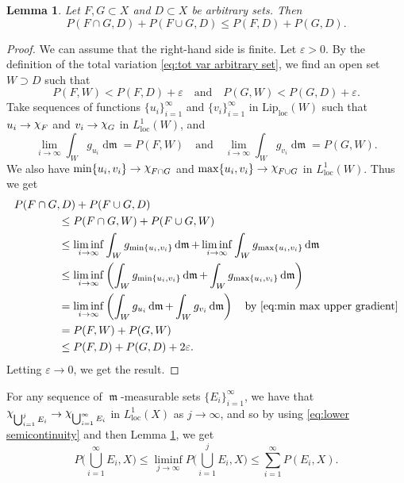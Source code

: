 \documentclass[11pt]{article}
\numberwithin{equation}{section}
\theoremstyle{plain}
\newtheorem{lemma}[equation]{Lemma}
\theoremstyle{definition}
\numberwithin{equation}{section}
\newcommand{\eps}{\varepsilon}
\newcommand{\loc}{\mathrm{loc}}
\newcommand{\liploc}{\mathrm{Lip}_{\mathrm{loc}}}
\newcommand{\ch}{\text{\raise 1.3pt \hbox{$\chi$}\kern-0.2pt}}
\DeclareMathOperator{\frm}{\mathfrak{m}}
\DeclareMathOperator{\dfrm}{d\mathfrak{m}}
\begin{document}
\begin{lemma}\label{lem:BV functions form algebra}
	Let $F,G\subset X$ and $D\subset X$ be arbitrary sets. Then
	\[
	P(F\cap G,D)+P(F\cup G,D)\le P(F,D)+P(G,D).
	\]
\end{lemma}
\begin{proof}
	We can assume that the right-hand side is finite. Let $\eps>0$.
	By the definition of the total variation \eqref{eq:tot var arbitrary set},
	we find an open set $W\supset D$ such that
	\begin{equation}\label{eq:choice of W and D}
	P(F,W)<P(F,D)+\eps\quad\textrm{and}\quad P(G,W)<P(G,D)+\eps.
	\end{equation}
	Take sequences
	of functions $\{u_i\}_{i=1}^{\infty}$ and $\{v_i\}_{i=1}^{\infty}$ in $\liploc(W)$
	such that $u_i\to \ch_F$ and $v_i\to \ch_G$ in $L^1_{\loc}(W)$, and
	\[
	\lim_{i\to\infty}\int_{W}g_{u_i}\dfrm= P(F,W)\quad\textrm{and}\quad
	\lim_{i\to\infty}\int_{W}g_{v_i}\dfrm= P(G,W).
	\]
	We also have $\min\{u_i,v_i\}\to \ch_{F\cap G}$ and
	$\max\{u_i,v_i\}\to \ch_{F\cup G}$ in $L^1_{\loc}(W)$. Thus we get
	\begin{align*}
	&P(F\cap G,D)+P(F\cup G,D)\\
	&\qquad\qquad\le P(F\cap G,W)+P(F\cup G,W)\\
	&\qquad\qquad\le \liminf_{i\to\infty}\int_{W} g_{\min\{u_i,v_i\}}\dfrm+
	\liminf_{i\to\infty}\int_{W} g_{\max\{u_i,v_i\}}\dfrm\\
	&\qquad\qquad\le \liminf_{i\to\infty}\left(\int_{W} g_{\min\{u_i,v_i\}}\dfrm+
	\int_{W} g_{\max\{u_i,v_i\}}\dfrm\right)\\
	&\qquad\qquad = \liminf_{i\to\infty}\left(\int_{W} g_{u_i}\dfrm+
	\int_{W} g_{v_i}\dfrm\right)\quad\textrm{by }\eqref{eq:min max upper gradient}\\
	&\qquad\qquad= P(F,W)+P(G,W)\\
	&\qquad\qquad\le  P(F,D)+P(G,D)+2\eps.
	\end{align*}
	Letting $\eps\to 0$, we get the result.
\end{proof}

For any sequence of $\frm$-measurable sets $\{E_i\}_{i=1}^{\infty}$, we have
that $\ch_{\bigcup_{i=1}^j E_i} \to \ch_{\bigcup_{i=1}^{\infty} E_i}$ in $L^1_{\loc}(X)$ as $j\to\infty$, and so
by using \eqref{eq:lower semicontinuity} and then Lemma \ref{lem:BV functions form algebra}, we get
\begin{equation}\label{eq:countable subadditivity}
P\Big(\bigcup_{i=1}^{\infty} E_i,X\Big)\le \liminf_{j\to\infty} P\Big(\bigcup_{i=1}^{j} E_i,X\Big)
\le \sum_{i=1}^{\infty} P(E_i,X).
\end{equation}
\end{document}
